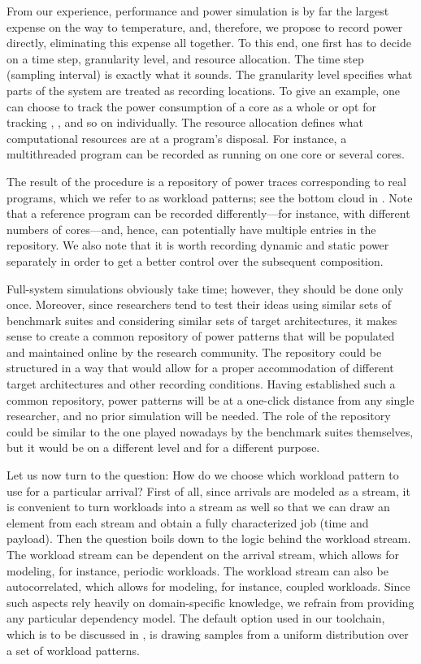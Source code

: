 From our experience, performance and power simulation is by far the largest
expense on the way to temperature, and, therefore, we propose to record power
directly, eliminating this expense all together. To this end, one first has to
decide on a time step, granularity level, and resource allocation. The time step
(sampling interval) is exactly what it sounds. The granularity level specifies
what parts of the system are treated as recording locations. To give an example,
one can choose to track the power consumption of a core as a whole or opt for
tracking , , and so on individually. The resource allocation
defines what computational resources are at a program's disposal. For instance,
a multithreaded program can be recorded as running on one core or several cores.

The result of the procedure is a repository of power traces corresponding to
real programs, which we refer to as workload patterns; see the bottom cloud in
. Note that a reference program can be recorded
differently---for instance, with different numbers of cores---and, hence, can
potentially have multiple entries in the repository. We also note that it is
worth recording dynamic and static power separately in order to get a better
control over the subsequent composition.

Full-system simulations obviously take time; however, they should be done only
once. Moreover, since researchers tend to test their ideas using similar sets of
benchmark suites and considering similar sets of target architectures, it makes
sense to create a common repository of power patterns that will be populated and
maintained online by the research community. The repository could be structured
in a way that would allow for a proper accommodation of different target
architectures and other recording conditions. Having established such a common
repository, power patterns will be at a one-click distance from any single
researcher, and no prior simulation will be needed. The role of the repository
could be similar to the one played nowadays by the benchmark suites themselves,
but it would be on a different level and for a different purpose.

Let us now turn to the question: How do we choose which workload pattern to use
for a particular arrival? First of all, since arrivals are modeled as a stream,
it is convenient to turn workloads into a stream as well so that we can draw an
element from each stream and obtain a fully characterized job (time and
payload). Then the question boils down to the logic behind the workload stream.
The workload stream can be dependent on the arrival stream, which allows for
modeling, for instance, periodic workloads. The workload stream can also be
autocorrelated, which allows for modeling, for instance, coupled workloads.
Since such aspects rely heavily on domain-specific knowledge, we refrain from
providing any particular dependency model. The default option used in our
toolchain, which is to be discussed in , is drawing samples from
a uniform distribution over a set of workload patterns.

